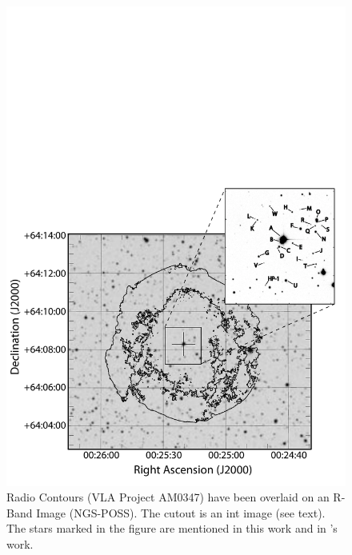 \begin{figure}[tb]
\includegraphics*[width = \textwidth]{chapter_sn1572_starg/plots/overview.pdf}
\caption[SN 1572 overview of candidate stars]{Radio Contours (VLA Project AM0347) have been overlaid \citep{1996ASPC..101...80G} on an R-Band Image (NGS-POSS). The cutout is an \gls{int} image (see text). The stars marked in the figure are mentioned in this work and in \rl's work. }
\label{fig:overview}
\end{figure}

